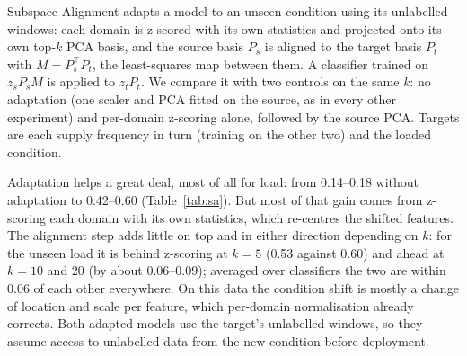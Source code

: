 Subspace Alignment \cite{fernando2013} adapts a model to an unseen condition using its
unlabelled windows: each domain is z-scored with its own statistics and projected onto its own
top-$k$ PCA basis, and the source basis $P_s$ is aligned to the target basis $P_t$ with
$M = P_s^\top P_t$, the least-squares map between them. A classifier trained on
$z_s P_s M$ is applied to $z_t P_t$. We compare it with two controls on the same $k$: no
adaptation (one scaler and PCA fitted on the source, as in every other experiment) and
per-domain z-scoring alone, followed by the source PCA. Targets are each supply frequency in
turn (training on the other two) and the loaded condition.

\begin{table}[t]
  \centering
  \caption{Adapting to an unseen condition: macro-F1 with no adaptation, per-domain z-scoring
  and Subspace Alignment (SA), mean over 5 seeds. Left: best of the six classifiers; right:
  their mean.}
  \label{tab:sa}
  \resizebox{\columnwidth}{!}{}
\end{table}

Adaptation helps a great deal, most of all for load: from 0.14--0.18 without adaptation to
0.42--0.60 (Table~\ref{tab:sa}). But most of that gain comes from z-scoring each domain with its
own statistics, which re-centres the shifted features. The alignment step adds little on top and
in either direction depending on $k$: for the unseen load it is behind z-scoring at $k=5$ (0.53
against 0.60) and ahead at $k=10$ and 20 (by about 0.06--0.09); averaged over classifiers the two
are within 0.06 of each other everywhere. On this data the condition shift is mostly a change of
location and scale per feature, which per-domain normalisation already corrects. Both adapted
models use the target's unlabelled windows, so they assume access to unlabelled data from the
new condition before deployment.
